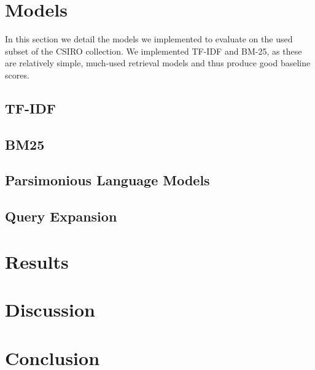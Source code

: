 \documentclass{article}
\begin{document}
\section*{Models}
In this section we detail the models we implemented to evaluate on the used subset of the CSIRO collection. We implemented TF-IDF and BM-25, as these are relatively simple, much-used retrieval models and thus produce good baseline scores.
\subsection*{TF-IDF}
\subsection*{BM25}
\subsection*{Parsimonious Language Models}
\subsection*{Query Expansion}


\section*{Results}

\section*{Discussion}

\section*{Conclusion}
\end{document}
